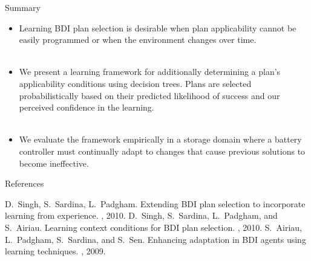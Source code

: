 \documentclass[10pt]{beamer}
\newcounter{finalframe}
\begin{document}
\begin{frame}[<+->]{Summary}
\action{}
\begin{itemize}
\item Learning BDI plan selection is desirable when plan applicability cannot be easily programmed or when the \alert{environment changes over time}.\\~\\
\item We present a \alert{learning framework} for additionally determining a plan's applicability conditions using decision trees. Plans are selected \alert{probabilistically} based on their predicted likelihood of success and our perceived \alert{confidence} in the learning.\\~\\
\item We evaluate the framework empirically in a storage domain where a battery controller must continually adapt to \alert{changes that cause previous solutions to become ineffective}.
\end{itemize}
\end{frame}

\setcounter{finalframe}{\value{framenumber}}
\appendix 

\begin{frame}{References}
\setcounter{framenumber}{\value{finalframe}}
  \begin{thebibliography}{10}
  \beamertemplatearticlebibitems
	D.~Singh, S.~Sardina, L.~Padgham.
	\newblock Extending BDI plan selection to incorporate learning from experience.
	, 2010.
	D.~Singh, S.~Sardina, L.~Padgham, and S.~Airiau.
	\newblock Learning context conditions for BDI plan selection.
	, 2010.
	S.~Airiau, L.~Padgham, S.~Sardina, and S.~Sen.
	\newblock Enhancing adaptation in {BDI} agents using learning techniques.
	, 2009.\\~\\
  \end{thebibliography}

\begin{block}{}\end{block}

\end{frame}


\end{document}
